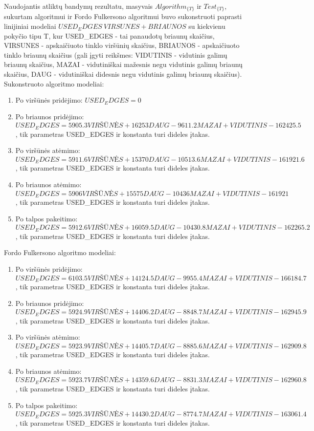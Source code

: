 Naudojantis atliktų bandymų rezultatu, masyvais $Algorithm_{\{T\}}$ ir $Test_{\{T\}}$,  sukurtam algoritmui ir Fordo Fulkersono algoritmui buvo sukonstruoti paprasti linijiniai modeliai $USED_EDGES ~ VIRSUNES + BRIAUNOS$ su kiekvienu pokyčio tipu T, kur USED\_EDGES - tai panaudotų briaunų skaičius, VIRSUNES - apskaičiuoto tinklo viršūnių skaičius, BRIAUNOS - apskaičiuoto tinklo briaunų skaičius (gali įgyti reikšmes: VIDUTINIS - vidutinis galimų briaunų skaičius, MAZAI - vidutiniškai mažesnis negu vidutinis galimų briaunų skaičius, DAUG - vidutiniškai didesnis negu vidutinis galimų briaunų skaičius). Sukonstruoto algoritmo modeliai:
\begin{enumerate}
	\item Po viršūnės pridėjimo: $USED_EDGES = 0$
	\item Po briaunos pridėjimo: $USED_EDGES = 5905.3VIRŠŪNĖS + 16253DAUG - 9611.2MAZAI + VIDUTINIS - 162425.5$, tik parametras USED\_EDGES ir konstanta turi dideles įtakas.
	\item Po viršūnės atėmimo: $USED_EDGES = 5911.6VIRŠŪNĖS + 15370DAUG - 10513.6MAZAI + VIDUTINIS - 161921.6$, tik parametras USED\_EDGES ir konstanta turi dideles įtakas.
	\item Po briaunos atėmimo: $USED_EDGES = 5906VIRŠŪNĖS + 15575DAUG -10436MAZAI + VIDUTINIS - 161921$, tik parametras USED\_EDGES ir konstanta turi dideles įtakas.
	\item Po talpos pakeitimo: $USED_EDGES = 5912.6VIRŠŪNĖS + 16059.5DAUG - 10430.8MAZAI + VIDUTINIS - 162265.2$, tik parametras USED\_EDGES ir konstanta turi dideles įtakas.
\end{enumerate}
Fordo Fulkersono algoritmo modeliai:
\begin{enumerate}
	\item Po viršūnės pridėjimo: $USED_EDGES = 6103.5VIRŠŪNĖS + 14124.5DAUG -9955.4MAZAI + VIDUTINIS - 166184.7$, tik parametras USED\_EDGES ir konstanta turi dideles įtakas.
	\item Po briaunos pridėjimo: $USED_EDGES = 5924.9VIRŠŪNĖS + 14406.2DAUG - 8848.7MAZAI + VIDUTINIS - 162945.9$, tik parametras USED\_EDGES ir konstanta turi dideles įtakas.
	\item Po viršūnės atėmimo: $USED_EDGES = 5923.9VIRŠŪNĖS + 14405.7DAUG - 8885.6MAZAI + VIDUTINIS - 162909.8$, tik parametras USED\_EDGES ir konstanta turi dideles įtakas.
	\item Po briaunos atėmimo: $USED_EDGES = 5923.7VIRŠŪNĖS + 14359.6DAUG - 8831.3MAZAI + VIDUTINIS - 162960.8$, tik parametras USED\_EDGES ir konstanta turi dideles įtakas.
	\item Po talpos pakeitimo: $USED_EDGES =5925.3VIRŠŪNĖS + 14430.2DAUG -8774.7MAZAI + VIDUTINIS - 163061.4$, tik parametras USED\_EDGES ir konstanta turi dideles įtakas.
\end{enumerate}
